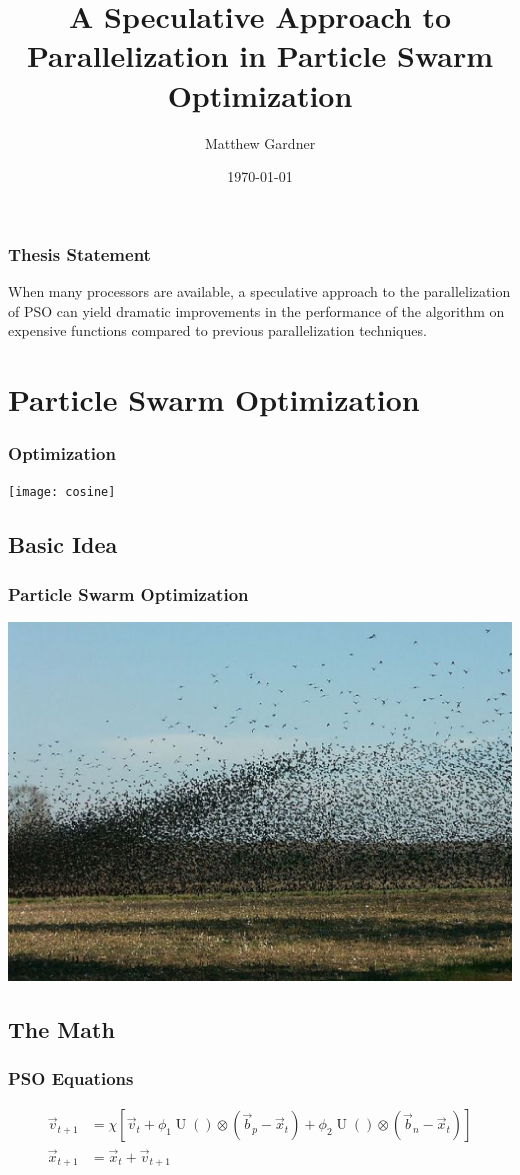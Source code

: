 \documentclass{beamer}
\title[A Speculative Approach to Parallelization in PSO]{A Speculative Approach
to Parallelization in Particle Swarm Optimization}
\author{Matthew Gardner}
\date{\today}
\DeclareMathOperator{\URand}{U}
\providecommand{\ppos}{\ensuremath{\Vec{x}}}
\providecommand{\pvel}{\ensuremath{\Vec{v}}}
\providecommand{\nbest}{\ensuremath{\Vec{b}_n}}
\providecommand{\pbest}{\ensuremath{\Vec{b}_p}}
\providecommand{\constriction}{\ensuremath{\chi}}
\providecommand{\coeff}{\ensuremath{\phi}}
\begin{document}
\begin{frame}
  \titlepage
\end{frame}

\begin{frame}
  \frametitle{Thesis Statement}
When many processors are available, a speculative approach to the
parallelization of PSO can yield dramatic improvements in the performance of
the algorithm on expensive functions compared to previous parallelization
techniques.
\end{frame}

\section{Particle Swarm Optimization}
\begin{frame}
  \frametitle{Optimization}
  \texttt{[image: cosine]}
\end{frame}

\subsection{Basic Idea}
\begin{frame}
  \frametitle{Particle Swarm Optimization}
  \includegraphics[width=\textwidth]{birds}
\end{frame}

\subsection{The Math}
\begin{frame}
  \frametitle{PSO Equations}
  \begin{align*}
	  \pvel_{t+1} &=
		  \constriction \left[ \pvel_t +
			  \coeff_1\URand()\otimes(\pbest - \ppos_t) +
			  \coeff_2\URand()\otimes(\nbest - \ppos_t)
		  \right] \\
	  \ppos_{t+1} &= \ppos_t + \pvel_{t+1}
  \end{align*}
\end{frame}
\end{document}
